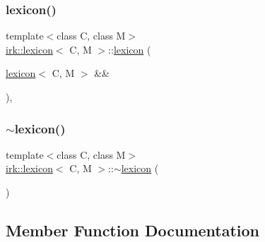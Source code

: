 \mbox{\label{classirk_1_1lexicon_aacc2d5a3f49dacc2dcf13480b904c252}} 
\subsubsection{\texorpdfstring{lexicon()}{lexicon()}\hspace{0.1cm}{\footnotesize\ttfamily [4/4]}}
{\footnotesize\ttfamily template$<$class C, class M$>$ \\
\mbox{\hyperlink{classirk_1_1lexicon}{irk\+::lexicon}}$<$ C, M $>$\+::\mbox{\hyperlink{classirk_1_1lexicon}{lexicon}} (\begin{DoxyParamCaption}\item[{\mbox{\hyperlink{classirk_1_1lexicon}{lexicon}}$<$ C, M $>$ \&\&}]{ }\end{DoxyParamCaption})\hspace{0.3cm}{\ttfamily [default]}, {\ttfamily [noexcept]}}

\mbox{\label{classirk_1_1lexicon_a4bfb764feda1ecabe2347d85c133edb3}} 
\subsubsection{\texorpdfstring{$\sim$lexicon()}{~lexicon()}}
{\footnotesize\ttfamily template$<$class C, class M$>$ \\
\mbox{\hyperlink{classirk_1_1lexicon}{irk\+::lexicon}}$<$ C, M $>$\+::$\sim$\mbox{\hyperlink{classirk_1_1lexicon}{lexicon}} (\begin{DoxyParamCaption}{ }\end{DoxyParamCaption})\hspace{0.3cm}{\ttfamily [default]}}



\subsection{Member Function Documentation}
\mbox{\label{classirk_1_1lexicon_a2704e317aeae4af801e47bc888329b06}} 
